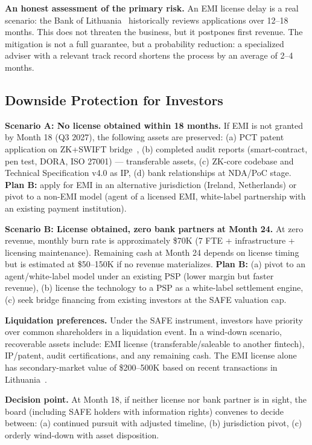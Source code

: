 \documentclass[11pt,a4paper]{article}
\begin{document}
\begin{tcolorbox}[warningbox]
\textbf{An honest assessment of the primary risk.} An EMI license delay is a real scenario: the Bank of Lithuania~\cite{lb_emi} historically reviews applications over 12--18 months. This does not threaten the business, but it postpones first revenue. The mitigation is not a full guarantee, but a probability reduction: a specialized adviser with a relevant track record shortens the process by an average of 2--4 months.
\end{tcolorbox}

\subsection*{Downside Protection for Investors}

\textbf{Scenario A: No license obtained within 18 months.} If EMI is not granted by Month 18 (Q3 2027), the following assets are preserved: (a) PCT patent application on ZK+SWIFT bridge~\cite{wipo_pct}, (b) completed audit reports (smart-contract, pen test, DORA, ISO 27001) --- transferable assets, (c) ZK-core codebase and Technical Specification v4.0 as IP, (d) bank relationships at NDA/PoC stage. \textbf{Plan B:} apply for EMI in an alternative jurisdiction (Ireland, Netherlands) or pivot to a non-EMI model (agent of a licensed EMI, white-label partnership with an existing payment institution).

\textbf{Scenario B: License obtained, zero bank partners at Month 24.} At zero revenue, monthly burn rate is approximately \$70K (7 FTE + infrastructure + licensing maintenance). Remaining cash at Month 24 depends on license timing but is estimated at \$50--150K if no revenue materializes. \textbf{Plan B:} (a) pivot to an agent/white-label model under an existing PSP (lower margin but faster revenue), (b) license the technology to a PSP as a white-label settlement engine, (c) seek bridge financing from existing investors at the SAFE valuation cap.

\textbf{Liquidation preferences.} Under the SAFE instrument, investors have priority over common shareholders in a liquidation event. In a wind-down scenario, recoverable assets include: EMI license (transferable/saleable to another fintech), IP/patent, audit certifications, and any remaining cash. The EMI license alone has secondary-market value of \$200--500K based on recent transactions in Lithuania~\cite{lb_emi,dealroom}.

\textbf{Decision point.} At Month 18, if neither license nor bank partner is in sight, the board (including SAFE holders with information rights) convenes to decide between: (a) continued pursuit with adjusted timeline, (b) jurisdiction pivot, (c) orderly wind-down with asset disposition.
\end{document}
